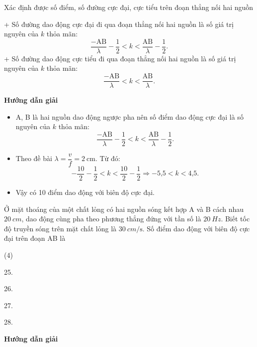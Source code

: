 \begin{dang}{Xác định được số điểm, số đường cực đại, cực tiểu trên đoạn thẳng nối hai nguồn}
{\begin{itemize}
			+ Số đường dao động cực đại đi qua đoạn thẳng nối hai nguồn là số giá trị nguyên của $k$ thỏa mãn: 
			\begin{equation*}
				\dfrac{-\text{AB}}{\lambda} -\dfrac{1}{2} < k < \dfrac{\text{AB}}{\lambda} -\dfrac{1}{2}.
			\end{equation*} 
			+ Số đường dao động cực tiểu đi qua đoạn thẳng nối hai nguồn là số giá trị nguyên của $k$ thỏa mãn: 
			\begin{equation*}
				\dfrac{-\text{AB}}{\lambda} < k < \dfrac{\text{AB}}{\lambda}.
			\end{equation*} 
			
	\end{itemize}}
	{
		\begin{center}
			\textbf{Hướng dẫn giải}
		\end{center}
		
		\begin{itemize}
			\item A, B là hai nguồn dao động ngược pha nên số điểm dao động cực đại là số nguyên của $k$ thỏa mãn:
			\begin{equation*}
				\dfrac{-\text{AB}}{\lambda} -\dfrac{1}{2} < k < \dfrac{\text{AB}}{\lambda} -\dfrac{1}{2}.
			\end{equation*}
			\item Theo đề bài $\lambda =\dfrac{v}{f}= 2\ \text{cm}$. Từ đó: 
			\begin{equation*}
				-\dfrac{10}{2} -\dfrac{1}{2} < k < \dfrac{10}{2} -\dfrac{1}{2} \Rightarrow -\text{5,5} < k < \text{4,5}.
			\end{equation*}
			\item Vậy có 10 điểm dao động với biên độ cực đại.
			
		\end{itemize}
	}
	{Ở mặt thoáng của một chất lỏng có hai nguồn sóng kết hợp A và B cách nhau $\SI{20}{cm}$, dao động cùng pha theo phương thẳng đứng với tần số là $\SI{20}{Hz}$. Biết tốc độ truyền sóng trên mặt chất lỏng là $\SI{30}{cm/\second}$. Số điểm dao động với biên độ cực đại trên đoạn AB là
		\begin{mcq}(4)
			\item 25.
			\item 26.
			\item 27.
			\item 28.
	\end{mcq}}
	{\begin{center}
			\textbf{Hướng dẫn giải}
		\end{center}
		
}
\end{dang}
